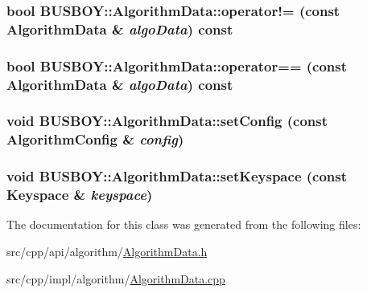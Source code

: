 \label{classBUSBOY_1_1AlgorithmData_a3c6fb3cbbedff5f3ac838aec02512968}
\hypertarget{classBUSBOY_1_1AlgorithmData_ac2fdf18f7ab43dcbaca7cb8c7e69c529}{
\subsubsection[{operator!=}]{\setlength{\rightskip}{0pt plus 5cm}bool BUSBOY::AlgorithmData::operator!= (const {\bf AlgorithmData} \& {\em algoData}) const}}
\label{classBUSBOY_1_1AlgorithmData_ac2fdf18f7ab43dcbaca7cb8c7e69c529}
\hypertarget{classBUSBOY_1_1AlgorithmData_ac8216a5e7dd52ee678d0990833b9e318}{
\subsubsection[{operator==}]{\setlength{\rightskip}{0pt plus 5cm}bool BUSBOY::AlgorithmData::operator== (const {\bf AlgorithmData} \& {\em algoData}) const}}
\label{classBUSBOY_1_1AlgorithmData_ac8216a5e7dd52ee678d0990833b9e318}
\hypertarget{classBUSBOY_1_1AlgorithmData_af41ce6bd179d7632c45a612512104694}{
\subsubsection[{setConfig}]{\setlength{\rightskip}{0pt plus 5cm}void BUSBOY::AlgorithmData::setConfig (const {\bf AlgorithmConfig} \& {\em config})}}
\label{classBUSBOY_1_1AlgorithmData_af41ce6bd179d7632c45a612512104694}
\hypertarget{classBUSBOY_1_1AlgorithmData_a61bf70552f02dc84dbb7bce343a090e8}{
\subsubsection[{setKeyspace}]{\setlength{\rightskip}{0pt plus 5cm}void BUSBOY::AlgorithmData::setKeyspace (const {\bf Keyspace} \& {\em keyspace})}}
\label{classBUSBOY_1_1AlgorithmData_a61bf70552f02dc84dbb7bce343a090e8}


The documentation for this class was generated from the following files:\begin{DoxyCompactItemize}
\item 
src/cpp/api/algorithm/\hyperlink{AlgorithmData_8h}{AlgorithmData.h}\item 
src/cpp/impl/algorithm/\hyperlink{AlgorithmData_8cpp}{AlgorithmData.cpp}\end{DoxyCompactItemize}
